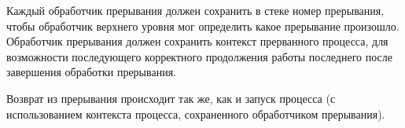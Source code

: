 Каждый обработчик прерывания должен сохранить в стеке номер прерывания, чтобы обработчик верхнего уровня
мог определить какое прерывание произошло. Обработчик прерывания должен сохранить контекст прерванного
процесса, для возможности последующего корректного продолжения работы последнего после завершения обработки
прерывания.

Возврат из прерывания происходит так же, как и запуск процесса (с использованием контекста процесса,
сохраненного обработчиком прерывания).

